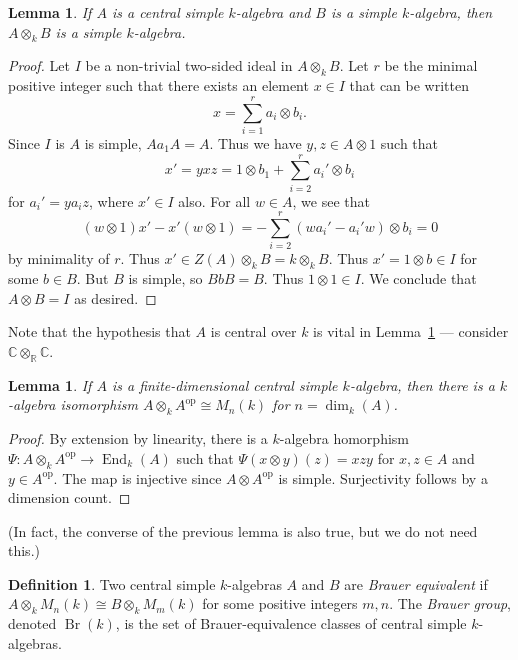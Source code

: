 \documentclass[12pt]{article}
\theoremstyle{plain}
\newtheorem{lemma}[theorem]{Lemma}
\theoremstyle{definition}
\newtheorem{definition}[theorem]{Definition}
\theoremstyle{remark}
\numberwithin{equation}{section}
\begin{document}
\begin{lemma} \label{lem:csa_simple_simple}
If $A$ is a central simple $k$-algebra and
$B$ is a simple $k$-algebra, then $A \otimes_k B$ is a simple
$k$-algebra.
\end{lemma}

\begin{proof}
Let $I$ be a non-trivial two-sided ideal in $A \otimes_k B$.
Let $r$ be the minimal positive integer such that
there exists an element $x \in I$ that can be written
\[
x = \sum_{i=1}^r a_i \otimes b_i.
\]
Since $I$ is $A$ is simple, $Aa_1A=A$.  Thus we have $y,z \in A \otimes 1$
such that
\[
x'=yxz = 1 \otimes b_1 + \sum_{i=2}^r a_i' \otimes b_i
\]
for $a_i'=ya_iz$, where $x' \in I$ also.
For all $w \in A$, we see that
\[
(w \otimes 1)x' - x'(w \otimes 1) = -\sum_{i=2}^r (wa_i'-a_i'w) \otimes
b_i = 0
\]
by minimality of $r$.  Thus $x' \in Z(A) \otimes_k B = k \otimes_k B$.
Thus $x'=1 \otimes b \in I$ for some $b \in B$.
But $B$ is simple, so $BbB=B$.  Thus $1 \otimes 1 \in I$.
We conclude that $A \otimes B = I$ as desired.
\end{proof}

Note that the hypothesis that $A$ is central over $k$ is vital
in Lemma~\ref{lem:csa_simple_simple} --- consider $\mathbb{C}
\otimes_{\mathbb{R}} \mathbb{C}$.

\begin{lemma}
If $A$ is a finite-dimensional central simple $k$-algebra,
then there is a $k$-algebra isomorphism
$A \otimes_k A^{\mathrm{op}} \cong M_n(k)$
for $n = \dim_k(A)$.
\end{lemma}

\begin{proof}
By extension by linearity, there is a $k$-algebra homorphism
$\Psi : A \otimes_k A^{\mathrm{op}} \to \operatorname{End}_k(A)$
such that $\Psi(x \otimes y)(z)=xzy$ for $x,z \in A$ and
$y \in A^{\mathrm{op}}$.  The map is injective since
$A \otimes A^{\mathrm{op}}$ is simple.
Surjectivity follows by a dimension count.
\end{proof}

(In fact, the converse of the previous lemma is also true, but we do not
need this.)

\begin{definition}
Two central simple $k$-algebras $A$ and $B$ are
\emph{Brauer equivalent} if $A \otimes_k M_n(k) \cong B \otimes_k
M_m(k)$ for some positive integers $m,n$.
The \emph{Brauer group}, denoted $\operatorname{Br}(k)$,
is the set of Brauer-equivalence classes
of central simple $k$-algebras.
\end{definition}
\end{document}
